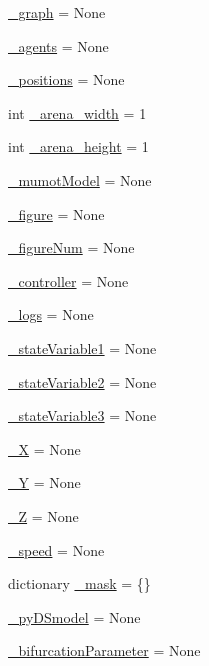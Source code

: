 \begin{DoxyCompactItemize}
\hyperlink{namespace_mu_mo_t_a752f43042d51a40fed348b434aad0fd8}{\+\_\+graph} = None
\item 
\hyperlink{namespace_mu_mo_t_a5032de31aad9de4528138249999e7d5f}{\+\_\+agents} = None
\item 
\hyperlink{namespace_mu_mo_t_a8be9986760a86837e04718906d18d596}{\+\_\+positions} = None
\item 
int \hyperlink{namespace_mu_mo_t_a372c083f5428e7f8a68298ec9dcca941}{\+\_\+arena\+\_\+width} = 1
\item 
int \hyperlink{namespace_mu_mo_t_a12711c70e125709b78f820722ba74d09}{\+\_\+arena\+\_\+height} = 1
\item 
\hyperlink{namespace_mu_mo_t_aeacd9541246371f0db5cc3e3779762fa}{\+\_\+mumot\+Model} = None
\item 
\hyperlink{namespace_mu_mo_t_abf6d9f6be3898e307415d4598cde264d}{\+\_\+figure} = None
\item 
\hyperlink{namespace_mu_mo_t_a5748371a5f2e09033908d21bb12f94c0}{\+\_\+figure\+Num} = None
\item 
\hyperlink{namespace_mu_mo_t_a15f56ca9811d1e67d721fa64f9b0dc1e}{\+\_\+controller} = None
\item 
\hyperlink{namespace_mu_mo_t_ac0ad5d0ca27f2668c0676334ee73ff52}{\+\_\+logs} = None
\item 
\hyperlink{namespace_mu_mo_t_aa14fa36730691becc6f3136899545416}{\+\_\+state\+Variable1} = None
\item 
\hyperlink{namespace_mu_mo_t_a9d3705d1d9182e10751ff693573d6d16}{\+\_\+state\+Variable2} = None
\item 
\hyperlink{namespace_mu_mo_t_ad2f8dc44173a16468bd9d3ab335f9b27}{\+\_\+state\+Variable3} = None
\item 
\hyperlink{namespace_mu_mo_t_abb529af75494ab2513e57b8434c7c975}{\+\_\+X} = None
\item 
\hyperlink{namespace_mu_mo_t_a17bd9f55d983ee8d5a6f22088d0397e8}{\+\_\+Y} = None
\item 
\hyperlink{namespace_mu_mo_t_a7b96cbb62a4ad08851fa147958f0d6e4}{\+\_\+Z} = None
\item 
\hyperlink{namespace_mu_mo_t_a3293b40663039bb46c8c977a9948436e}{\+\_\+speed} = None
\item 
dictionary \hyperlink{namespace_mu_mo_t_acbf4bc8fa26c3cf9e1d2741cc3dea058}{\+\_\+mask} = \{\}
\item 
\hyperlink{namespace_mu_mo_t_a9e9a430da6d323cc4411c070e0c7eee5}{\+\_\+py\+D\+Smodel} = None
\item 
\hyperlink{namespace_mu_mo_t_a17d5bd0e623faea6f50fc3b7f01d0d38}{\+\_\+bifurcation\+Parameter} = None

\end{DoxyCompactItemize}
